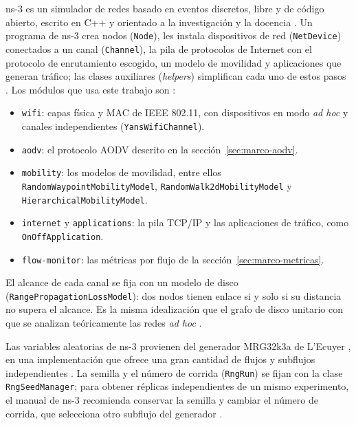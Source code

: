 ns-3 es un simulador de redes basado en eventos discretos, libre y de código abierto,
escrito en C++ y orientado a la investigación y la docencia \cite{zarate2021wireless}.
Un programa de ns-3 crea nodos (\texttt{Node}), les instala dispositivos de red
(\texttt{NetDevice}) conectados a un canal (\texttt{Channel}), la pila de protocolos de
Internet con el protocolo de enrutamiento escogido, un modelo de movilidad y
aplicaciones que generan tráfico; las clases auxiliares (\emph{helpers}) simplifican
cada uno de estos pasos \cite{zarate2021wireless}. Los módulos que usa este trabajo son
\cite{ns3doc}:

{\sloppy
\begin{itemize}
    \item \texttt{wifi}: capas física y MAC de IEEE 802.11, con dispositivos en modo
    \emph{ad hoc} y canales independientes (\texttt{YansWifiChannel}).
    \item \texttt{aodv}: el protocolo AODV descrito en la sección~\ref{sec:marco-aodv}.
    \item \texttt{mobility}: los modelos de movilidad, entre ellos
    \texttt{RandomWaypointMobilityModel}, \texttt{RandomWalk2dMobilityModel} y
    \texttt{HierarchicalMobilityModel}.
    \item \texttt{internet} y \texttt{applications}: la pila TCP/IP y las aplicaciones
    de tráfico, como \texttt{OnOffApplication}.
    \item \texttt{flow-monitor}: las métricas por flujo de la
    sección~\ref{sec:marco-metricas}.
\end{itemize}\par}

El alcance de cada canal se fija con un modelo de disco
(\texttt{RangePropagationLossModel}): dos nodos tienen enlace si y solo si su distancia
no supera el alcance. Es la misma idealización que el grafo de disco unitario con que se
analizan teóricamente las redes \emph{ad hoc} \cite{barbeau2007principles}.

Las variables aleatorias de ns-3 provienen del generador MRG32k3a de L'Ecuyer
\cite{lecuyer1999good}, en una implementación que ofrece una gran cantidad de flujos y
subflujos independientes \cite{lecuyer2002object}. La semilla y el número de corrida
(\texttt{RngRun}) se fijan con la clase \texttt{RngSeedManager}; para obtener réplicas
independientes de un mismo experimento, el manual de ns-3 recomienda conservar la
semilla y cambiar el número de corrida, que selecciona otro subflujo del generador
\cite{ns3random}.

